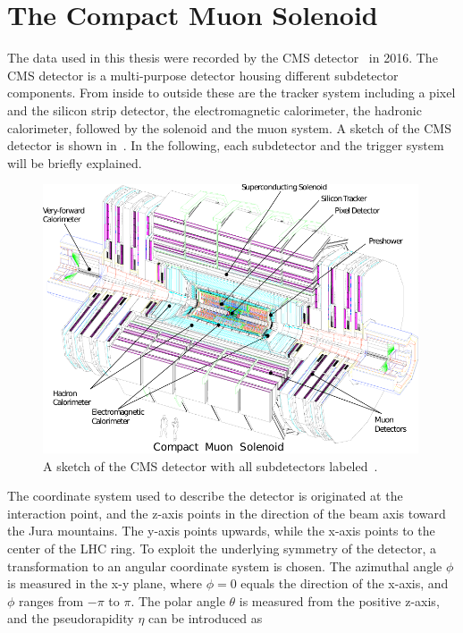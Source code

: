\section{The Compact Muon Solenoid}\label{sec:CMS}
The data used in this thesis were recorded by the CMS detector~\cite{CMS,CMSTDR} in 2016. The CMS detector is a multi-purpose detector housing different subdetector components. From inside to outside these are the tracker system including a pixel and the silicon strip detector, the electromagnetic calorimeter, the hadronic calorimeter, followed by the solenoid and the muon system. A sketch of the CMS detector is shown in~. In the following, each subdetector and the trigger system will be briefly explained.\\
\begin{figure}[tbp]
 \centering
 \includegraphics[width=0.99\textwidth]{figures/general/cms}
 \caption{A sketch of the CMS detector with all subdetectors labeled~\cite{CMSTDR}.}
 \label{fig:CMS}
\end{figure}
The coordinate system used to describe the detector is originated at the interaction point, and the z-axis points in the direction of the beam axis toward the Jura mountains. The y-axis points upwards, while the x-axis points to the center of the LHC ring. To exploit the underlying symmetry of the detector, a transformation to an angular coordinate system is chosen. The azimuthal angle $\phi$ is measured in the x-y plane, where $\phi=0$ equals the direction of the x-axis, and $\phi$ ranges from $-\pi$ to $\pi$. The polar angle $\theta$ is measured from the positive z-axis, and the pseudorapidity $\eta$ can be introduced as
